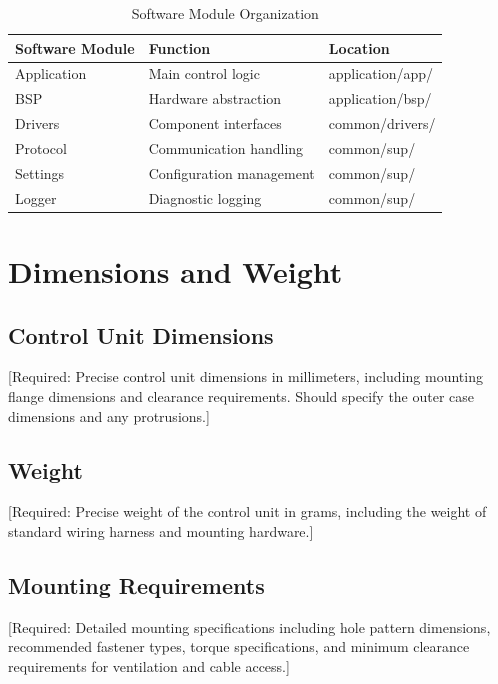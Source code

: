 \documentclass[12pt,a4paper,twoside,openright]{book}
\newcommand{\tabletextfont}{\normalfont\rmfamily}
\newcommand{\tableheadfont}{\normalfont\bfseries}
\begin{document}
\begin{table}[h]
\centering
\setlength{\tabcolsep}{5pt} %
\begin{tabular}{|p{}|p{}|p{}|}
\hline
\tableheadfont\textbf{Software Module} & \tableheadfont\textbf{Function} & \tableheadfont\textbf{Location} \\
\hline
\tabletextfont Application & Main control logic & application/app/ \\
\hline
\tabletextfont BSP & Hardware abstraction & application/bsp/ \\
\hline
\tabletextfont Drivers & Component interfaces & common/drivers/ \\
\hline
\tabletextfont Protocol & Communication handling & common/sup/ \\
\hline
\tabletextfont Settings & Configuration management & common/sup/ \\
\hline
\tabletextfont Logger & Diagnostic logging & common/sup/ \\
\hline
\end{tabular}
\caption{Software Module Organization}
\end{table}

\section{Dimensions and Weight}

\subsection{Control Unit Dimensions}
{\color{missingred}[Required: Precise control unit dimensions in millimeters, including mounting flange dimensions and clearance requirements. Should specify the outer case dimensions and any protrusions.]}

\subsection{Weight}
{\color{missingred}[Required: Precise weight of the control unit in grams, including the weight of standard wiring harness and mounting hardware.]}

\subsection{Mounting Requirements}
{\color{missingred}[Required: Detailed mounting specifications including hole pattern dimensions, recommended fastener types, torque specifications, and minimum clearance requirements for ventilation and cable access.]}
\end{document}
